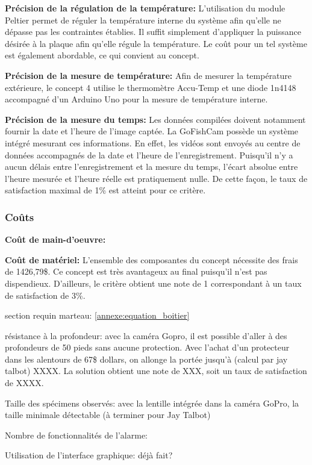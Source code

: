 \textbf{Précision de la régulation de la température:} L'utilisation du module Peltier permet de réguler la température interne du système afin qu'elle ne dépasse pas les contraintes établies. Il suffit simplement d'appliquer la puissance désirée à la plaque afin qu'elle régule la température. Le coût pour un tel système est également abordable, ce qui convient au concept.
\vspace{5mm}

\textbf{Précision de la mesure de température:} Afin de mesurer la température extérieure, le concept 4 utilise le thermomètre Accu-Temp et une diode 1n4148 accompagné d'un Arduino Uno pour la mesure de température interne. 
\vspace{5mm}

\textbf{Précision de la mesure du temps:} Les données compilées doivent notamment fournir la date et l'heure de l'image captée. La GoFishCam possède un système intégré mesurant ces informations. En effet, les vidéos sont envoyés au centre de données accompagnés de la date et l'heure de l'enregistrement. Puisqu'il n'y a aucun délais entre l'enregistrement et la mesure du temps, l'écart absolue entre l'heure mesurée et l'heure réelle est pratiquement nulle. De cette façon, le taux de satisfaction maximal de 1\% est atteint pour ce critère. 


\subsubsection{Coûts}

\textbf{Coût de main-d'oeuvre:}
\vspace{5mm}

\textbf{Coût de matériel:} L'ensemble des composantes du concept nécessite des frais de 1426,79\$. Ce concept est très avantageux au final puisqu'il n'est pas dispendieux. D'ailleurs, le critère obtient une note de 1 correspondant à un taux de satisfaction de 3\%.
\vspace{5mm}


section requin marteau:
\ref{annexe:equation_boitier}

résistance à la profondeur: avec la caméra Gopro, il est possible d'aller 
à des profondeurs de 50 pieds sans aucune protection. Avec l'achat d'un protecteur dans les alentours de 67\$ dollars, on allonge la portée jusqu'à (calcul par jay talbot) XXXX. La solution obtient une note de XXX, soit un taux de satisfaction de XXXX. 

Taille des spécimens observés: avec la lentille intégrée dans la caméra GoPro, la taille minimale détectable (à terminer pour Jay Talbot)

Nombre de fonctionnalités de l'alarme: 

Utilisation de l'interface graphique: déjà fait?

